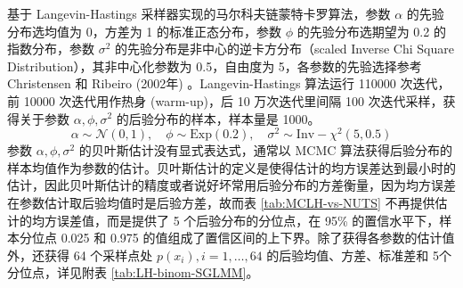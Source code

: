 \documentclass[12pt,a4paper,UTF8,twoside]{book}
\theoremstyle{definition}
\theoremstyle{definition}
\theoremstyle{definition}
\theoremstyle{remark}
\begin{document}
基于 Langevin-Hastings 采样器实现的马尔科夫链蒙特卡罗算法，参数
\(\alpha\) 的先验分布选均值为 0，方差为 1 的标准正态分布，参数 \(\phi\)
的先验分布选期望为 0.2 的指数分布，参数 \(\sigma^2\)
的先验分布是非中心的逆卡方分布（scaled Inverse Chi Square
Distribution），其非中心化参数为 0.5，自由度为 5，各参数的先验选择参考
Christensen 和 Ribeiro (2002年) \citep{geoRglm2002}。Langevin-Hastings
算法运行 110000 次迭代，前 10000 次迭代用作热身 (warm-up)，后 10
万次迭代里间隔 100 次迭代采样，获得关于参数 \(\alpha,\phi,\sigma^2\)
的后验分布的样本，样本量是 1000。 \begin{equation}
\alpha \sim \mathcal{N}(0,1), \quad \phi \sim \mathrm{Exp}(0.2), \quad \sigma^2  \sim \mathrm{Inv-}\chi^2(5,0.5)
\end{equation} 参数 \(\alpha,\phi,\sigma^2\)
的贝叶斯估计没有显式表达式，通常以 MCMC
算法获得后验分布的样本均值作为参数的估计。贝叶斯估计的定义是使得估计的均方误差达到最小时的估计，因此贝叶斯估计的精度或者说好坏常用后验分布的方差衡量，因为均方误差在参数估计取后验均值时是后验方差，故而表
\ref{tab:MCLH-vs-NUTS} 不再提供估计的均方误差值，而是提供了 5
个后验分布的分位点，在 95\% 的置信水平下，样本分位点 0.025 和 0.975
的值组成了置信区间的上下界。除了获得各参数的估计值外，还获得 64
个采样点处 \(p(x_i), i = 1, \ldots, 64\) 的后验均值、方差、标准差和
5个分位点，详见附表 \ref{tab:LH-binom-SGLMM}。
\end{document}
